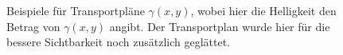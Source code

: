 \begin{figure}
\centering
{}\hfill
{}
\caption{Beispiele für Transportpläne $\gamma(x,y)$,
wobei hier die Helligkeit den Betrag von $\gamma(x,y)$ angibt.
Der Transportplan wurde hier für die bessere Sichtbarkeit noch zusätzlich geglättet.
}
\label{mongekant:fig:transport_plans}
\end{figure}

